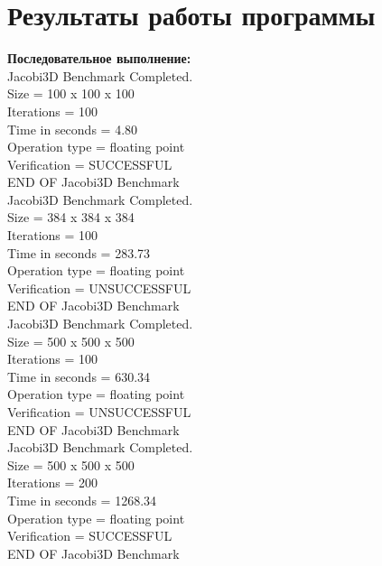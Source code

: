 \documentclass[a4paper,12pt,titlepage,draft]{article}
\begin{document}
\section{Результаты работы программы}
\begin{minipage}{.5\textwidth}
\textbf{Последовательное выполнение:}\\

 Jacobi3D Benchmark Completed.\\
 Size            =  100 x  100 x  100\\
 Iterations      =                100\\
 Time in seconds =               4.80\\
 Operation type  =     floating point\\
 Verification    =         SUCCESSFUL\\
 END OF Jacobi3D Benchmark\\
 
Jacobi3D Benchmark Completed.\\
Size            =  384 x  384 x  384\\
Iterations      =                100\\
Time in seconds =             283.73\\
Operation type  =     floating point\\
Verification    =       UNSUCCESSFUL\\
END OF Jacobi3D Benchmark\\

Jacobi3D Benchmark Completed.\\
 Size            =  500 x  500 x  500\\
 Iterations      =                100\\
 Time in seconds =             630.34\\
 Operation type  =     floating point\\
 Verification    =       UNSUCCESSFUL\\
 END OF Jacobi3D Benchmark\\

Jacobi3D Benchmark Completed.\\
 Size            =  500 x  500 x  500\\
 Iterations      =                200\\
 Time in seconds =            1268.34\\
 Operation type  =     floating point\\
 Verification    =         SUCCESSFUL\\
 END OF Jacobi3D Benchmark\\
 
\end{minipage}
\end{document}
